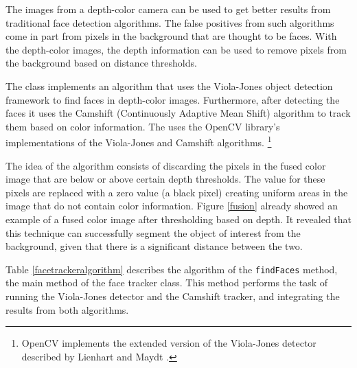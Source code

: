 The images from a depth-color camera can be used to get better results from traditional face detection 
algorithms. The false positives from such algorithms come in part from pixels in the background that are 
thought to be faces. With the depth-color images, the depth information can be used to remove pixels from the 
background based on distance thresholds.

The \FaceTracker{} class implements an algorithm that uses the Viola-Jones object detection framework 
\cite{Viola} to find faces in depth-color images. Furthermore, after detecting the faces it uses the Camshift
(Continuously Adaptive Mean Shift) algorithm \cite{BradskiCamshift} to track them based on color information. 
The \FaceTracker{} uses the OpenCV library's implementations of the Viola-Jones and Camshift algorithms. 
\footnote{OpenCV implements the extended version of the Viola-Jones detector described by Lienhart and 
Maydt \cite{Lienhart}.}

The idea of the \FaceTracker{} algorithm consists of discarding the pixels in the fused color image that are
below or above certain depth thresholds. The value for these pixels are replaced with a zero value (a black 
pixel) creating uniform areas in the image that do not contain color information. Figure \ref{fusion} already
showed an example of a fused color image after thresholding based on depth. It revealed that this technique
can successfully segment the object of interest from the background, given that there is a significant distance
between the two.

Table \ref{facetrackeralgorithm} describes the algorithm of the \texttt{find\-Fac\-es} method, the main method 
of the face tracker class. This method performs the task of running the Viola-Jones detector and the Camshift 
tracker, and integrating the results from both algorithms.


